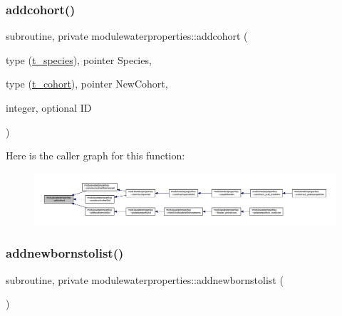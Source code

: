 \subsubsection{\texorpdfstring{addcohort()}{addcohort()}}
{\footnotesize\ttfamily subroutine, private modulewaterproperties\+::addcohort (\begin{DoxyParamCaption}\item[{type (\mbox{\hyperlink{structmodulewaterproperties_1_1t__species}{t\+\_\+species}}), pointer}]{Species,  }\item[{type (\mbox{\hyperlink{structmodulewaterproperties_1_1t__cohort}{t\+\_\+cohort}}), pointer}]{New\+Cohort,  }\item[{integer, optional}]{ID }\end{DoxyParamCaption})\hspace{0.3cm}{\ttfamily [private]}}

Here is the caller graph for this function\+:\nopagebreak
\begin{figure}[H]
\begin{center}
\leavevmode
\includegraphics[width=350pt]{namespacemodulewaterproperties_a2a206e94af2b9f46781896fdc7ccfb3a_icgraph}
\end{center}
\end{figure}
\mbox{\label{namespacemodulewaterproperties_a201bc7106a0e1c889114fc878140e91f}} 
\subsubsection{\texorpdfstring{addnewbornstolist()}{addnewbornstolist()}}
{\footnotesize\ttfamily subroutine, private modulewaterproperties\+::addnewbornstolist (\begin{DoxyParamCaption}{ }\end{DoxyParamCaption})\hspace{0.3cm}{\ttfamily [private]}}

